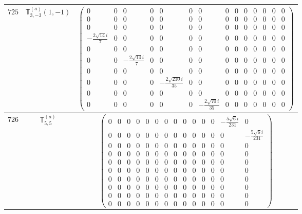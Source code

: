 \documentclass[fleqn,8pt,landscape]{jsarticle}
\begin{document}
\begin{center}
\begin{longtable}{ccc}
$ 725 $ & $ \mathbb{T}_{3,-3}^{(a)}(1,-1) $ & $ \begin{pmatrix} 0 & 0 & 0 & 0 & 0 & 0 & 0 & 0 & 0 & 0 & 0 & 0 & 0 & 0 \\ 0 & 0 & 0 & 0 & 0 & 0 & 0 & 0 & 0 & 0 & 0 & 0 & 0 & 0 \\ 0 & 0 & 0 & 0 & 0 & 0 & 0 & 0 & 0 & 0 & 0 & 0 & 0 & 0 \\ - \frac{2 \sqrt{14} i}{7} & 0 & 0 & 0 & 0 & 0 & 0 & 0 & 0 & 0 & 0 & 0 & 0 & 0 \\ 0 & 0 & 0 & 0 & 0 & 0 & 0 & 0 & 0 & 0 & 0 & 0 & 0 & 0 \\ 0 & 0 & - \frac{2 \sqrt{14} i}{7} & 0 & 0 & 0 & 0 & 0 & 0 & 0 & 0 & 0 & 0 & 0 \\ 0 & 0 & 0 & 0 & 0 & 0 & 0 & 0 & 0 & 0 & 0 & 0 & 0 & 0 \\ 0 & 0 & 0 & 0 & - \frac{2 \sqrt{210} i}{35} & 0 & 0 & 0 & 0 & 0 & 0 & 0 & 0 & 0 \\ 0 & 0 & 0 & 0 & 0 & 0 & 0 & 0 & 0 & 0 & 0 & 0 & 0 & 0 \\ 0 & 0 & 0 & 0 & 0 & 0 & - \frac{2 \sqrt{70} i}{35} & 0 & 0 & 0 & 0 & 0 & 0 & 0 \end{pmatrix} $ \\ \hline
$ 726 $ & $ \mathbb{T}_{5,5}^{(a)} $ & $ \begin{pmatrix} 0 & 0 & 0 & 0 & 0 & 0 & 0 & 0 & 0 & 0 & 0 & 0 & - \frac{5 \sqrt{6} i}{231} & 0 \\ 0 & 0 & 0 & 0 & 0 & 0 & 0 & 0 & 0 & 0 & 0 & 0 & 0 & - \frac{5 \sqrt{6} i}{231} \\ 0 & 0 & 0 & 0 & 0 & 0 & 0 & 0 & 0 & 0 & 0 & 0 & 0 & 0 \\ 0 & 0 & 0 & 0 & 0 & 0 & 0 & 0 & 0 & 0 & 0 & 0 & 0 & 0 \\ 0 & 0 & 0 & 0 & 0 & 0 & 0 & 0 & 0 & 0 & 0 & 0 & 0 & 0 \\ 0 & 0 & 0 & 0 & 0 & 0 & 0 & 0 & 0 & 0 & 0 & 0 & 0 & 0 \\ 0 & 0 & 0 & 0 & 0 & 0 & 0 & 0 & 0 & 0 & 0 & 0 & 0 & 0 \\ 0 & 0 & 0 & 0 & 0 & 0 & 0 & 0 & 0 & 0 & 0 & 0 & 0 & 0 \\ 0 & 0 & 0 & 0 & 0 & 0 & 0 & 0 & 0 & 0 & 0 & 0 & 0 & 0 \\ 0 & 0 & 0 & 0 & 0 & 0 & 0 & 0 & 0 & 0 & 0 & 0 & 0 & 0 \end{pmatrix} $ \\ \hline

\end{longtable}
\end{center}
\end{document}
